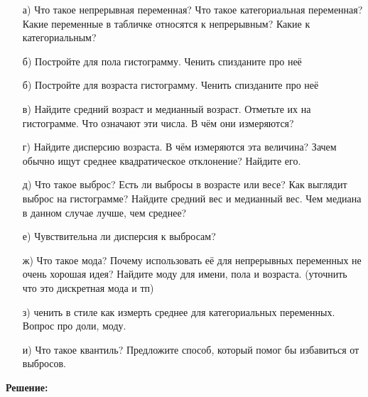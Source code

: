 \documentclass[12pt, a4paper, oneside]{article}
\begin{document}
\begin{enumerate}
	\item[а)] Что такое непрерывная переменная? Что такое категориальная переменная? Какие переменные в табличке относятся к непрерывным? Какие к категориальным? 
	
	\item[б)]  Постройте для пола гистограмму.  Ченить спизданите про неё 
	
	\item[б)]  Постройте для возраста гистограмму.  Ченить спизданите про неё 

	\item[в)] Найдите средний возраст и медианный возраст. Отметьте их на гистограмме. Что означают эти числа. В чём они измеряются? 
	
	\item[г)] Найдите дисперсию возраста. В чём измеряются эта величина? Зачем обычно ищут среднее квадратическое отклонение? Найдите его. 
	
	\item[д)] Что такое выброс? Есть ли выбросы в возрасте или весе? Как выглядит выброс на гистограмме? Найдите средний вес и медианный вес. Чем медиана в данном случае лучше, чем среднее?
	
	\item[е)] Чувствительна ли дисперсия к выбросам?
	
	\item[ж)] Что такое мода? Почему использовать её для непрерывных переменных не очень хорошая идея? Найдите моду для имени, пола и возраста.  (уточнить что это дискретная мода и тп) 
		
	\item[з)]  ченить в стиле как измерть среднее для категориальных переменных. Вопрос про доли, моду. 
	
	\item[и)]  Что такое квантиль? Предложите способ, который помог бы избавиться от выбросов. 	
\end{enumerate}





\textbf{Решение:} 
\end{document}
